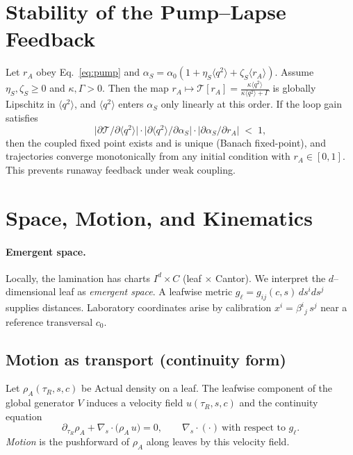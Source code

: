 \documentclass[11pt]{article}
\begin{document}
\section{Stability of the Pump--Lapse Feedback}
\label{sec:stability}
Let \(r_A\) obey Eq.~\eqref{eq:pump} and \(\alpha_S=\alpha_0(1+\eta_S\langle q^2\rangle+\zeta_S\langle r_A\rangle)\).
Assume \(\eta_S,\zeta_S\ge 0\) and \(\kappa,\Gamma>0\).
Then the map \(r_A\mapsto \mathcal T[r_A]=\frac{\kappa \langle q^2\rangle}{\kappa \langle q^2\rangle+\Gamma}\) is globally Lipschitz in \(\langle q^2\rangle\), and \(\langle q^2\rangle\) enters \(\alpha_S\) only linearly at this order.
If the loop gain satisfies 
\[
\big|\partial \mathcal T/\partial \langle q^2\rangle\big|\cdot \big|\partial \langle q^2\rangle/\partial \alpha_S\big|\cdot |\partial \alpha_S/\partial r_A| \;<\; 1,
\]
then the coupled fixed point exists and is unique (Banach fixed-point), and trajectories converge monotonically from any initial condition with \(r_A\in[0,1]\).
This prevents runaway feedback under weak coupling.


\section{Space, Motion, and Kinematics}
\label{sec:space_motion}

\paragraph{Emergent space.} Locally, the lamination has charts $I^d\times C$ (leaf $\times$ Cantor).
We interpret the $d$--dimensional leaf as \emph{emergent space}.
A leafwise metric $g_\ell=g_{ij}(c,s)\,ds^i ds^j$ supplies distances.
Laboratory coordinates arise by calibration $x^i=\beta^i{}_j\,s^j$ near a reference transversal $c_0$.

\subsection{Motion as transport (continuity form)}
Let $\rho_A(\tau_R,s,c)$ be Actual density on a leaf.
The leafwise component of the global generator $V$ induces a velocity field $u(\tau_R,s,c)$ and the continuity equation
\begin{equation}
\partial_{\tau_R}\rho_A + \nabla_s\!\cdot\big(\rho_A\,u\big)=0,
\qquad \nabla_s\!\cdot(\cdot)\ \text{with respect to } g_\ell.
\end{equation}
\emph{Motion} is the pushforward of $\rho_A$ along leaves by this velocity field.
\end{document}
